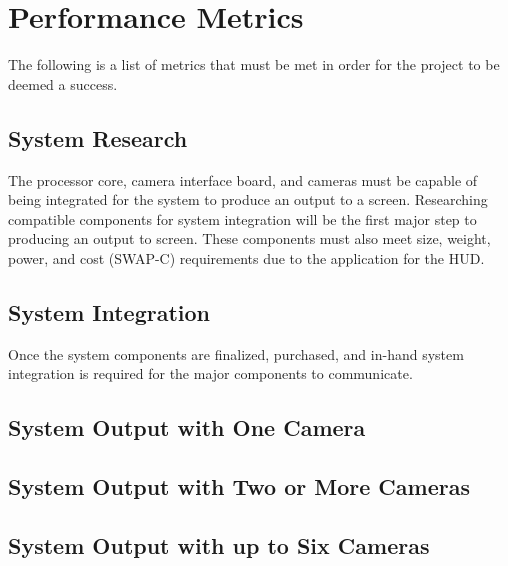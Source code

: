 \documentclass[letterpaper,10pt,serif,draftclsnofoot,onecolumn,compsoc,titlepage]{IEEEtran}
\begin{document}
\section{Performance Metrics}

The following is a list of metrics that must be met in order for the project to be deemed a success.\\

\subsection{System Research}

The processor core, camera interface board, and cameras must be capable of being integrated for the system to produce an output to a screen. Researching compatible components for system integration will be the first major step to producing an output to screen. These components must also meet size, weight, power, and cost (SWAP-C) requirements due to the application for the HUD. \\

\subsection{System Integration}
Once the system components are finalized, purchased, and in-hand system integration is required for the major components to communicate. 

\subsection{System Output with One Camera}

\subsection{System Output with Two or More Cameras}

\subsection{System Output with up to Six Cameras}
\end{document}
